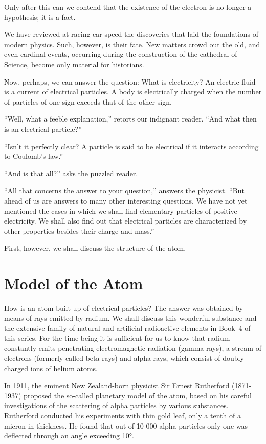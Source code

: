 Only after this can we contend that the existence of the electron is no longer a hypothesis; it is a fact.

We have reviewed at racing-car speed the discoveries that laid the foundations of modern physics. Such, however, is their fate. New matters crowd out the old, and even cardinal events, occurring during the construction of the cathedral of Science, become only material for historians.

Now, perhaps, we can answer the question: What is electricity? An electric fluid is a current of electrical particles. A body is electrically charged when the number of particles of one sign exceeds that of the other sign.

``Well, what a feeble explanation,'' retorts our indignant reader. ``And what then is an electrical particle?''

``Isn't it perfectly clear? A particle is said to be electrical if it interacts according to Coulomb's law.''

``And is that all?'' asks the puzzled reader.

``All that concerns the answer to your question,'' answers the physicist. ``But ahead of us are answers to many other interesting questions. We have not yet mentioned the cases in which we shall find elementary particles of positive electricity. We shall also find out that electrical particles are characterized by other properties besides their charge and mass.''

First, however, we shall discuss the structure of the atom.

\section{Model of the Atom}
How is an atom built up of electrical particles? The answer was obtained by means of rays emitted by radium. We shall discuss this wonderful substance and the extensive family of natural and artificial radioactive elements in Book~4 of this series. For the time being it is sufficient for us to know that radium constantly emits penetrating electromagnetic radiation (gamma rays), a stream of electrons (formerly called beta rays) and alpha rays, which consist of doubly charged ions of helium atoms.

In 1911, the eminent New Zealand-born physicist Sir Ernest Rutherford (1871-1937) proposed the so-called planetary model of the atom, based on his careful investigations of the scattering of alpha particles by various substances. Rutherford conducted his experiments with thin gold leaf, only a tenth of a micron in thickness. He found that out of 10 000 alpha particles only one was deflected through an angle exceeding \ang{10}.

